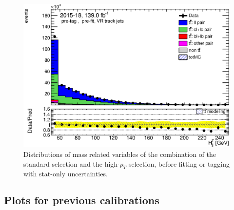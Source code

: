 \documentclass[letterpaper,12pt]{article}
\begin{document}
\begin{figure}[H]
\begin{minipage}[b]{.45\textwidth}
	\end{minipage}\hfill
	\begin{minipage}[b]{.45\textwidth}
	\centering
	\includegraphics[width=1\textwidth]{Oct_distributions/pretagNoRwDL1rwithhighpTVRJets_scaledall/DataMC_Htjj.eps}
	\end{minipage}
	\caption{Distributions of mass related variables of the combination 
	of the standard selection and the high-$p_T$ selection, 
	before fitting or tagging with stat-only uncertainties.} \label{fig:mass_VRJets}
	\end{figure}
	


\subsection{Plots for previous calibrations}
\end{document}
